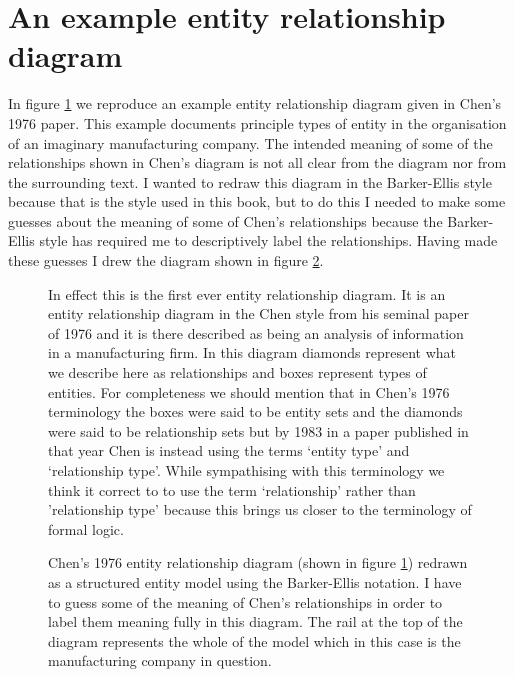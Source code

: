 \section{An example entity relationship diagram}
In figure \ref{ChenManufacturingExample} we reproduce an example entity relationship diagram  given in Chen's 1976 paper. This example documents principle types of entity in the organisation of an imaginary manufacturing company. The intended meaning of some of the relationships shown in Chen's diagram is not all clear from the diagram nor from the surrounding text. I wanted to redraw
this diagram in the Barker-Ellis style because that is the style used in this book, but to do this I needed to make some guesses about the meaning of some of Chen's relationships because the Barker-Ellis style has required me to descriptively label the relationships. Having made these guesses I drew the diagram shown
 in figure \ref{ChenManufacturingBarkerEllisStyle}. 

\begin{figure} [H]
\begin{center}

\end{center}
\caption{
In effect this is the first ever entity relationship diagram. It is an entity relationship diagram in the Chen style from his seminal paper of 1976 and it is there described as being an analysis of information in a manufacturing firm. In this diagram
diamonds represent what we describe here as relationships and boxes represent types of entities.  
For completeness we should mention that in Chen's 1976 terminology the boxes were said to be entity sets and the diamonds were said to be relationship sets but by 1983 in a paper published in that year Chen is instead using the terms `entity type' and `relationship type'. While sympathising with this terminology we think it correct to to use the term `relationship' rather than 'relationship type' because this brings us closer to the terminology of formal logic.
}
\label{ChenManufacturingExample}
\end{figure}

\begin{figure} [H]
\begin{center}

\end{center}
\caption{
Chen's 1976 entity relationship diagram (shown in figure \ref{ChenManufacturingExample}) redrawn as a structured entity model using the Barker-Ellis notation. 
I have to guess some of the meaning of Chen's relationships in order to label them meaning fully in this diagram. The rail at the top of the diagram represents the whole of the model which in this case is the manufacturing company in question.
}
\label{ChenManufacturingBarkerEllisStyle}
\end{figure}

